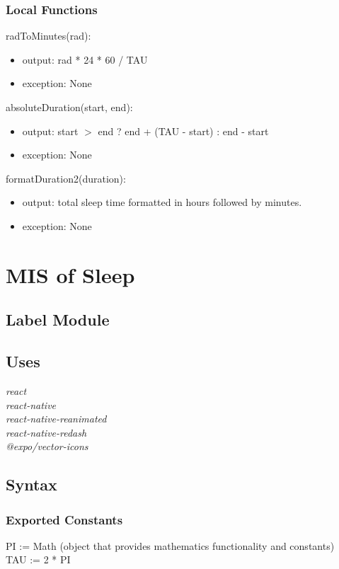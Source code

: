 \documentclass[12pt, titlepage]{article}
\begin{document}
\subsubsection{Local Functions}

\noindent radToMinutes(rad):
\begin{itemize}
	\item output: rad * 24 * 60 / TAU
	\item exception: None 
\end{itemize}

\noindent absoluteDuration(start, end):
\begin{itemize}
	\item output: start $>$ end ? end + (TAU - start) : end - start  
	\item exception: None 
\end{itemize}

\noindent formatDuration2(duration):
\begin{itemize}
	\item output: total sleep time formatted in hours followed by minutes.
	\item exception: None 
\end{itemize}

\section{MIS of Sleep} \label{Module} 

\subsection{Label Module}

\subsection{Uses}
{\textit{react}}\\
{\textit{react-native}}\\
{\textit{react-native-reanimated}}\\
{\textit{react-native-redash}}\\
{\textit{@expo/vector-icons}}

\subsection{Syntax}

\subsubsection{Exported Constants}
PI := Math (object that provides mathematics functionality and constants)\\
TAU := 2 * PI
\end{document}
